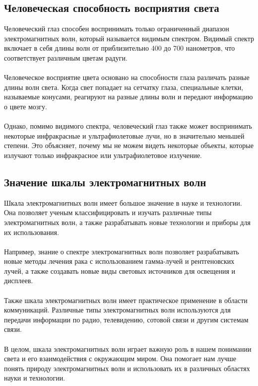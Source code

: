 \documentclass{article}
\begin{document}
\subsection{Человеческая способность восприятия света}
Человеческий глаз способен воспринимать только ограниченный диапазон электромагнитных волн, который называется видимым спектром. Видимый спектр включает в себя длины волн от приблизительно 400 до 700 нанометров, что соответствует различным цветам радуги.\\
~\\
Человеческое восприятие цвета основано на способности глаза различать разные длины волн света. Когда свет попадает на сетчатку глаза, специальные клетки, называемые конусами, реагируют на разные длины волн и передают информацию о цвете мозгу.\\
~\\
Однако, помимо видимого спектра, человеческий глаз также может воспринимать некоторые инфракрасные и ультрафиолетовые лучи, но в значительно меньшей степени. Это объясняет, почему мы не можем видеть некоторые объекты, которые излучают только инфракрасное или ультрафиолетовое излучение.
\subsection{Значение шкалы электромагнитных волн}
Шкала электромагнитных волн имеет большое значение в науке и технологии. Она позволяет ученым классифицировать и изучать различные типы электромагнитных волн, а также разрабатывать новые технологии и приборы для их использования.\\
~\\
Например, знание о спектре электромагнитных волн позволяет разрабатывать новые методы лечения рака с использованием гамма-лучей и рентгеновских лучей, а также создавать новые виды световых источников для освещения и дисплеев.\\
~\\
Также шкала электромагнитных волн имеет практическое применение в области коммуникаций. Различные типы электромагнитных волн используются для передачи информации по радио, телевидению, сотовой связи и другим системам связи.\\
~\\
В целом, шкала электромагнитных волн играет важную роль в нашем понимании света и его взаимодействия с окружающим миром. Она помогает нам лучше понять природу электромагнитных волн и использовать их в различных областях науки и технологии.
\end{document}
